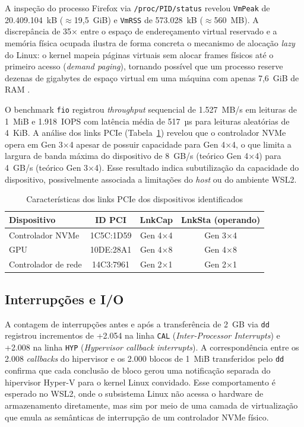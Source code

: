 \documentclass[12pt]{article}
\begin{document}
A inspeção do processo Firefox via \texttt{/proc/PID/status} revelou \texttt{VmPeak} de 20.409.104~kB ($\approx$19,5~GiB) e \texttt{VmRSS} de 573.028~kB ($\approx$560~MB). A discrepância de 35× entre o espaço de endereçamento virtual reservado e a memória física ocupada ilustra de forma concreta o mecanismo de alocação \textit{lazy} do Linux: o kernel mapeia páginas virtuais sem alocar frames físicos até o primeiro acesso (\textit{demand paging}), tornando possível que um processo reserve dezenas de gigabytes de espaço virtual em uma máquina com apenas 7,6~GiB de RAM \cite{tanenbaum2015}.

O benchmark \texttt{fio} registrou \textit{throughput} sequencial de 1.527~MB/s em leituras de 1~MiB e 1.918~IOPS com latência média de 517~µs para leituras aleatórias de 4~KiB. A análise dos links PCIe (Tabela~\ref{tab:pcie}) revelou que o controlador NVMe opera em Gen 3×4 apesar de possuir capacidade para Gen 4×4, o que limita a largura de banda máxima do dispositivo de 8~GB/s (teórico Gen 4×4) para 4~GB/s (teórico Gen 3×4). Esse resultado indica subutilização da capacidade do dispositivo, possivelmente associada a limitações do \textit{host} ou do ambiente WSL2.

\begin{table}[H]
\centering
\caption{Características dos links PCIe dos dispositivos identificados}
\label{tab:pcie}
\begin{tabular}{lccc}
\toprule
\textbf{Dispositivo} & \textbf{ID PCI} & \textbf{LnkCap} & \textbf{LnkSta (operando)} \\
\midrule
Controlador NVMe  & 1C5C:1D59 & Gen 4×4 & Gen 3×4 \\
GPU               & 10DE:28A1 & Gen 4×8 & Gen 4×8 \\
Controlador de rede & 14C3:7961 & Gen 2×1 & Gen 2×1 \\
\bottomrule
\end{tabular}
\end{table}

\subsection{Interrupções e I/O}

A contagem de interrupções antes e após a transferência de 2~GB via \texttt{dd} registrou incrementos de +2.054 na linha \texttt{CAL} (\textit{Inter-Processor Interrupts}) e +2.008 na linha \texttt{HYP} (\textit{Hypervisor callback interrupts}). A correspondência entre os 2.008 \textit{callbacks} do hipervisor e os 2.000 blocos de 1~MiB transferidos pelo \texttt{dd} confirma que cada conclusão de bloco gerou uma notificação separada do hipervisor Hyper-V para o kernel Linux convidado. Esse comportamento é esperado no WSL2, onde o subsistema Linux não acessa o hardware de armazenamento diretamente, mas sim por meio de uma camada de virtualização que emula as semânticas de interrupção de um controlador NVMe físico.
\end{document}
